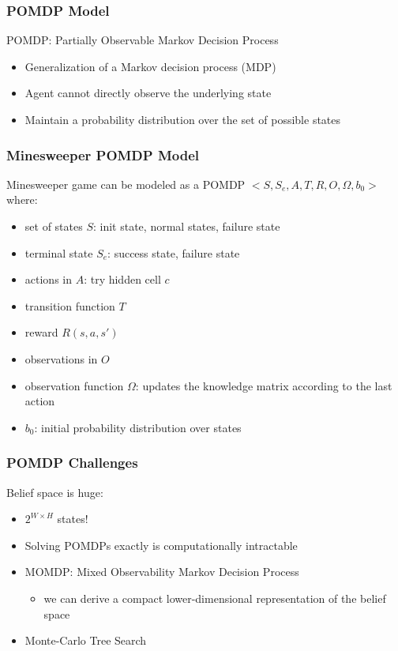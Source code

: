 \documentclass[aspectratio=169]{beamer}
\begin{document}
\begin{frame}
	\frametitle{POMDP Model}
	POMDP: Partially Observable Markov Decision Process
	\begin{itemize}
	    \item Generalization of a Markov decision process (MDP)
	    \item Agent cannot directly observe the underlying state
	    \item Maintain a probability distribution over the set of possible states
	\end{itemize}
\end{frame}

\begin{frame}
	\frametitle{Minesweeper POMDP Model}
	Minesweeper game can be modeled as a POMDP $<S, S_e, A, T, R, O, \Omega, b_0>$ where:

	\begin{itemize}
		\item set of states $S$: init state, normal states, failure state
		\item terminal state $S_e$: success state, failure state
		\item actions in $A$: try hidden cell $c$
		\item transition function $T$
		\item reward $R(s, a, s')$
		\item observations in $O$
		\item observation function $\Omega$: updates the knowledge matrix according to the last action
		\item $b_0$: initial probability distribution over states
	\end{itemize}
\end{frame}

\begin{frame}
	\frametitle{POMDP Challenges}
	Belief space is huge: 
	\begin{itemize}
		\item $2^{W \times H}$ states!
		\item Solving POMDPs exactly is computationally intractable
		\item MOMDP: Mixed Observability Markov Decision Process
		\begin{itemize}
			\item we can derive a compact lower-dimensional representation of the belief space
		\end{itemize}
		\item Monte-Carlo Tree Search
	\end{itemize}
\end{frame}
\end{document}
